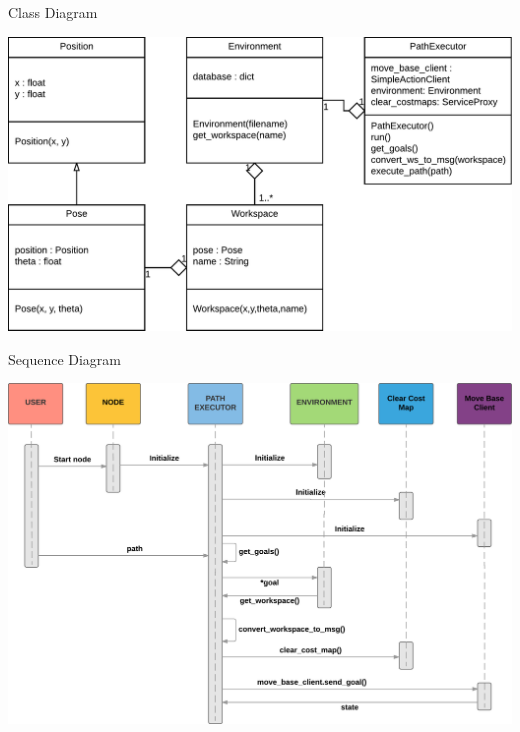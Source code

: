 \begin{frame}{Class Diagram}
    \begin{center}
        \includegraphics[width=\linewidth,height=0.9\textheight,keepaspectratio]{gfx/01.pdf}
    \end{center}
\end{frame}


\begin{frame}{Sequence Diagram}
    \begin{center}
        \includegraphics[width=\linewidth,height=0.9\textheight,keepaspectratio]{gfx/02.pdf}
    \end{center}
\end{frame}